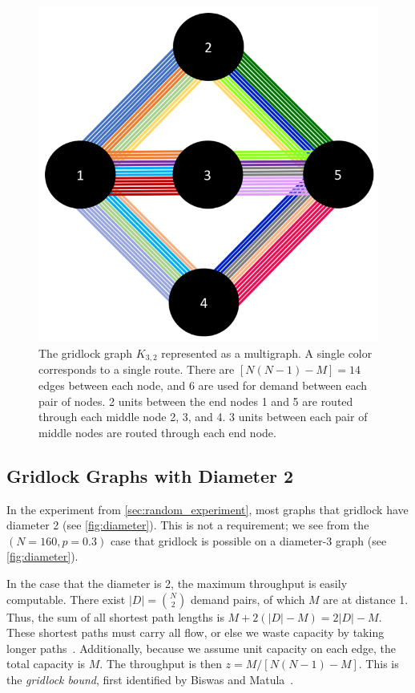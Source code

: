 \begin{figure}
\centering
\includegraphics[height=0.25\textheight]{fig/k32_integer}
\caption{The gridlock graph $K_{3,2}$ represented as a multigraph. A single color corresponds to a single route. There are $[N (N-1) - M] = 14$ edges between each node, and 6 are used for demand between each pair of nodes. 2 units between the end nodes 1 and 5 are routed through each middle node 2, 3, and 4. 3 units between each pair of middle nodes are routed through each end node.}
\label{fig:k32_integer}
\end{figure}




\subsection{Gridlock Graphs with Diameter 2}

In the experiment from \autoref{sec:random_experiment}, most graphs that gridlock have diameter 2 (see \autoref{fig:diameter}). This is not a requirement; we see from the $(N=160, p=0.3)$ case that gridlock is possible on a diameter-3 graph (see \autoref{fig:diameter}).

In the case that the diameter is 2, the maximum throughput is easily computable. There exist $|D| = {N \choose 2}$ demand pairs, of which $M$ are at distance 1. Thus, the sum of all shortest path lengths is $M + 2(|D| - M) = 2|D| - M$. These shortest paths must carry all flow, or else we waste capacity by taking longer paths~\cite{mann2008extensions}. Additionally, because we assume unit capacity on each edge, the total capacity is $M$. The throughput is then $z = M / [N (N-1) - M]$. This is the \emph{gridlock bound}, first identified by Biswas and Matula~\cite{biswas1986two}. 

